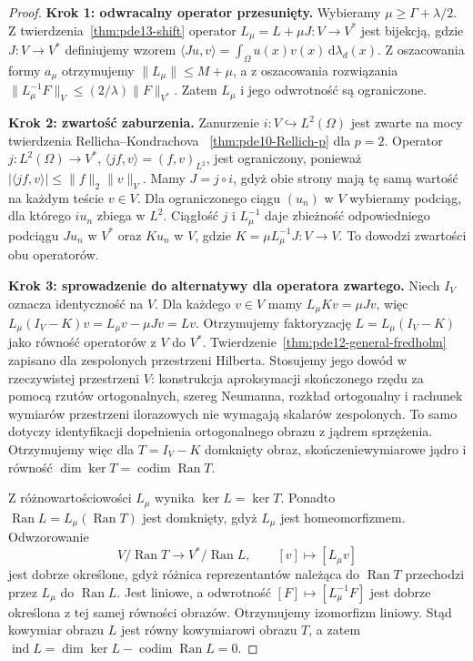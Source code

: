 \begin{proof}
\textbf{Krok 1: odwracalny operator przesunięty.}
Wybieramy $\mu\geq\Gamma+\lambda/2$.
Z twierdzenia~\ref{thm:pde13-shift} operator
$L_\mu=L+\mu J:V\to V^*$ jest bijekcją, gdzie
$J:V\to V^*$ definiujemy wzorem
$\langle Ju,v\rangle=\int_\Omega u(x)v(x)\,\mathrm d\lambda_d(x)$.
Z oszacowania formy $a_\mu$ otrzymujemy
$\|L_\mu\|\le M+\mu$, a z oszacowania rozwiązania
$\|L_\mu^{-1}F\|_V\le (2/\lambda)\|F\|_{V^*}$.
Zatem $L_\mu$ i jego odwrotność są ograniczone.

\textbf{Krok 2: zwartość zaburzenia.}
Zanurzenie $i:V\hookrightarrow L^2(\Omega)$ jest zwarte
na mocy twierdzenia Rellicha--Kondrachova
~\ref{thm:pde10-Rellich-p} dla $p=2$.
Operator $j:L^2(\Omega)\to V^*$,
$\langle jf,v\rangle=(f,v)_{L^2}$, jest ograniczony,
ponieważ $|\langle jf,v\rangle|\le\|f\|_2\|v\|_V$.
Mamy $J=j\circ i$, gdyż obie strony mają tę samą wartość
na każdym teście $v\in V$. Dla ograniczonego ciągu $(u_n)$
w $V$ wybieramy podciąg, dla którego $iu_n$ zbiega w $L^2$.
Ciągłość $j$ i $L_\mu^{-1}$ daje zbieżność odpowiedniego
podciągu $Ju_n$ w $V^*$ oraz $Ku_n$ w $V$, gdzie
$K=\mu L_\mu^{-1}J:V\to V$.
To dowodzi zwartości obu operatorów.

\textbf{Krok 3: sprowadzenie do alternatywy dla operatora zwartego.}
Niech $I_V$ oznacza identyczność na $V$.
Dla każdego $v\in V$ mamy
$L_\mu Kv=\mu Jv$, więc
$L_\mu(I_V-K)v=L_\mu v-\mu Jv=Lv$.
Otrzymujemy faktoryzację $L=L_\mu(I_V-K)$ jako równość
operatorów z $V$ do $V^*$.
Twierdzenie~\ref{thm:pde12-general-fredholm} zapisano
dla zespolonych przestrzeni Hilberta. Stosujemy jego dowód
w rzeczywistej przestrzeni $V$: konstrukcja aproksymacji
skończonego rzędu za pomocą rzutów ortogonalnych, szereg Neumanna,
rozkład ortogonalny i rachunek wymiarów przestrzeni ilorazowych
nie wymagają skalarów zespolonych. To samo dotyczy identyfikacji
dopełnienia ortogonalnego obrazu z jądrem sprzężenia.
Otrzymujemy więc dla $T=I_V-K$ domknięty obraz,
skończeniewymiarowe jądro i równość
$\dim\ker T=\operatorname{codim}\operatorname{Ran}T$.

Z różnowartościowości $L_\mu$ wynika $\ker L=\ker T$.
Ponadto $\operatorname{Ran}L=L_\mu(\operatorname{Ran}T)$
jest domknięty, gdyż $L_\mu$ jest homeomorfizmem.
Odwzorowanie
\[
 V/\operatorname{Ran}T\longrightarrow V^*/\operatorname{Ran}L,
 \qquad [v]\longmapsto[L_\mu v]
\]
jest dobrze określone, gdyż różnica reprezentantów
należąca do $\operatorname{Ran}T$ przechodzi przez $L_\mu$
do $\operatorname{Ran}L$. Jest liniowe, a odwrotność
$[F]\mapsto[L_\mu^{-1}F]$ jest dobrze określona z tej samej
równości obrazów. Otrzymujemy izomorfizm liniowy. Stąd kowymiar obrazu
$L$ jest równy kowymiarowi obrazu $T$, a zatem
$\operatorname{ind}L=\dim\ker L-\operatorname{codim}\operatorname{Ran}L=0$.


\end{proof}
